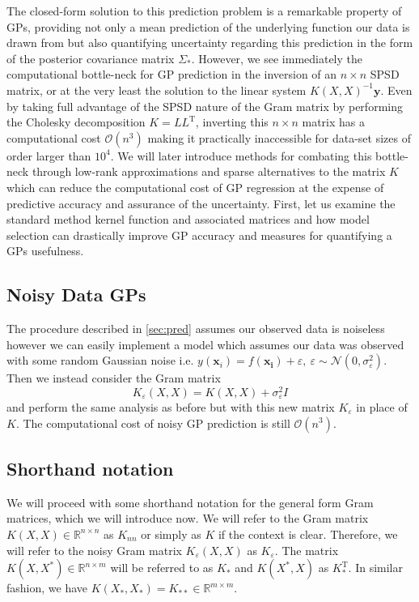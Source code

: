 \documentclass[10pt,a4paper]{article}
\numberwithin{equation}{section}
\theoremstyle{plain}
\theoremstyle{definition}
\theoremstyle{own}
\begin{document}
The closed-form solution to this prediction problem is a remarkable property of GPs, providing not only a mean prediction of the underlying function our data is drawn from but also quantifying uncertainty regarding this prediction in the form of the posterior covariance matrix $\Sigma_*$. However, we see immediately the computational bottle-neck for GP prediction in the inversion of an $n \times n$ SPSD matrix, or at the very least the solution to the linear system $K(X,X)^{-1}\mathbf{y}$. Even by taking full advantage of the SPSD nature of the Gram matrix by performing the Cholesky decomposition $K = LL^{\text{T}}$, inverting this $n \times n$ matrix has a computational cost $\mathcal{O}(n^3)$ making it practically inaccessible for data-set sizes of order larger than $10^4$. We will later introduce methods for combating this bottle-neck through low-rank approximations and sparse alternatives to the matrix $K$ which can reduce the computational cost of GP regression at the expense of predictive accuracy and assurance of the uncertainty. First, let us examine the standard method kernel function and associated matrices and how model selection can drastically improve GP accuracy and measures for quantifying a GPs usefulness.
\subsection{Noisy Data GPs} \label{sec:noisypred}
The procedure described in \ref{sec:pred} assumes our observed data is noiseless however we can easily implement a model which assumes our data was observed with some random Gaussian noise i.e. $y(\mathbf{x}_i) = f(\mathbf{x_i}) + \varepsilon,~ \varepsilon \sim \mathcal{N}(0, \sigma_\varepsilon^2)$. Then we instead consider the Gram matrix \[K_\varepsilon(X,X) = K(X,X) + \sigma_\varepsilon^2 I\] and perform the same analysis as before but with this new matrix $K_\varepsilon$ in place of $K$. The computational cost of noisy GP prediction is still $\mathcal{O}(n^3)$.
\subsection{Shorthand notation}
We will proceed with some shorthand notation for the general form Gram matrices, which we will introduce now. We will refer to the Gram matrix $K(X,X) \in \mathbb{R}^{n \times n}$ as $K_{nn}$ or simply as $K$ if the context is clear. Therefore, we will refer to the noisy Gram matrix $K_\varepsilon(X,X)$ as $K_\varepsilon$. The matrix $K(X,X^*) \in \mathbb{R}^{n \times m}$ will be referred to as $K_*$ and $K(X^*, X)$ as $K_*^{\text{T}}$. In similar fashion, we have $K(X_*, X_*) = K_{**} \in \mathbb{R}^{m\times m}$.
\end{document}
